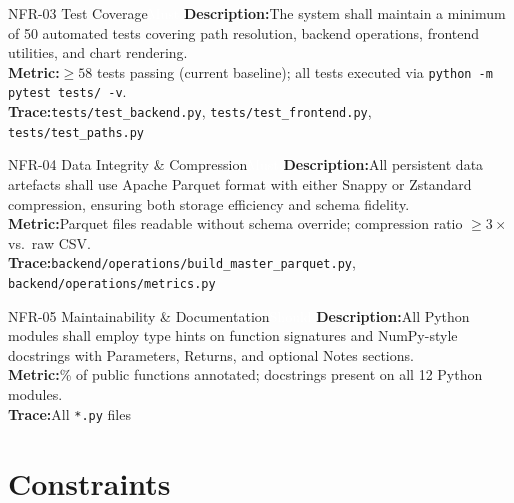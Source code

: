 \documentclass[
  11pt,
  a4paper,
  twoside,
  openany
]{report}
\begin{document}
\vspace{6pt}

\begin{requirement}{NFR-03 \;\textbar\; Test Coverage\hfill\textcolor{white}{Must}}
\textbf{Description:}\;The system shall maintain a minimum of 50 automated tests covering path resolution, backend operations, frontend utilities, and chart rendering.\\[4pt]
\textbf{Metric:}\;$\geq 58$ tests passing (current baseline); all tests executed via \texttt{python -m pytest tests/ -v}.\\[4pt]
\textbf{Trace:}\;\texttt{tests/test\_backend.py}, \texttt{tests/test\_frontend.py}, \texttt{tests/test\_paths.py}
\end{requirement}

\vspace{6pt}

\begin{requirement}{NFR-04 \;\textbar\; Data Integrity \& Compression\hfill\textcolor{white}{\small Must}}
\textbf{Description:}\;All persistent data artefacts shall use Apache Parquet format with either Snappy or Zstandard compression, ensuring both storage efficiency and schema fidelity.\\[4pt]
\textbf{Metric:}\;Parquet files readable without schema override; compression ratio $\geq 3\times$ vs.\ raw CSV.\\[4pt]
\textbf{Trace:}\;\texttt{backend/operations/build\_master\_parquet.py},\\ \texttt{backend/operations/metrics.py}
\end{requirement}

\vspace{6pt}

\begin{requirement}{NFR-05 \;\textbar\; Maintainability \& Documentation\hfill\textcolor{white}{Should}}
\textbf{Description:}\;All Python modules shall employ type hints on function signatures and NumPy-style docstrings with Parameters, Returns, and optional Notes sections.\\[4pt]
\textbf{Metric:}\% of public functions annotated; docstrings present on all 12 Python modules.\\[4pt]
\textbf{Trace:}\;All \texttt{*.py} files
\end{requirement}

\section{Constraints}
\end{document}
